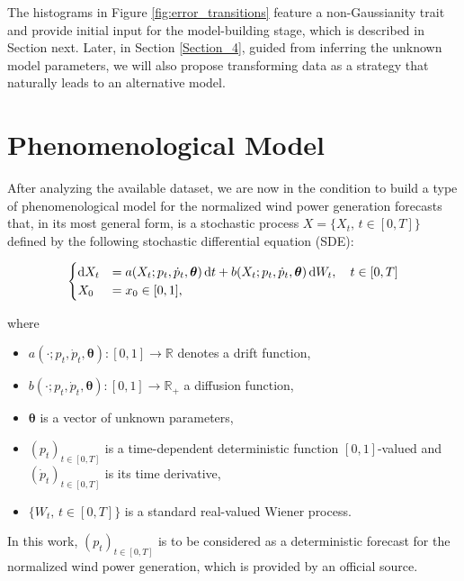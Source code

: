\documentclass[11pt]{article}
\theoremstyle{definition}
\begin{document}
The histograms in Figure \ref{fig:error_transitions} feature a non-Gaussianity trait and provide initial input for the model-building stage, which is described in Section next.
Later, in Section \ref{Section_4}, guided from inferring the unknown model parameters, we will also propose transforming data as a strategy that naturally leads to an alternative model.



\section{Phenomenological  Model} \label{Section_3}

After analyzing the available dataset, we are now in the condition to build a type of phenomenological model for the normalized wind power generation forecasts that, in its most general form, is a stochastic process $X = \{X_t, \, t \in [0, T] \}$  defined by the following stochastic differential equation (SDE):

\begin{equation}
\begin{cases}
    \dif X_t &=  a(X_t; p_t, \dot{p}_t,\bm{\theta})\dif t + b (X_t; p_t, \dot{p}_t, \bm{\theta} )\dif W_t, \quad t \in [0,T]  \\
     X_0  &=  x_0 \in [0,1],
\end{cases}
 \label{eq:main}
\end{equation} 

where

\begin{itemize}
\item $a(\cdot; p_t, \dot{p}_t, \bm{\theta}): [0,1] \to \mathbb{R} $  denotes a drift function,
\item $b(\cdot; p_t, \dot{p}_t, \bm{\theta}): [0,1] \to \mathbb{R}_+ $  a  diffusion function,
\item $\bm{\theta}$ is a vector of unknown parameters,
\item $(p_t)_{t \in [0,T]}$ is a time-dependent deterministic function $[0,1]$-valued and $ (\dot{p}_t)_{t \in [0,T]}$ is its time derivative,
\item $\{W_t, \, t \in [0,T] \}$ is a standard real-valued Wiener process.
\end{itemize}

In this work, $(p_t)_{t \in [0,T]}$ is to be considered as a deterministic forecast for the normalized wind power generation, which is provided by an official source. 
\end{document}
